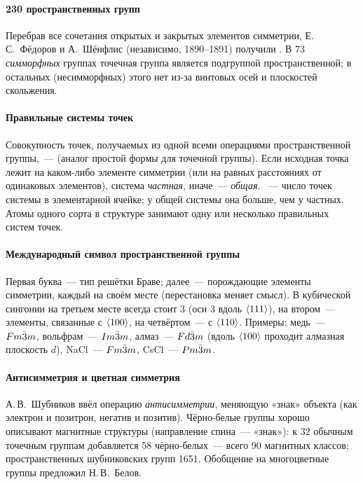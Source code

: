 \paragraph{230 пространственных групп}
Перебрав все сочетания открытых и закрытых элементов симметрии,
Е.\,С.~Фёдоров и А.~Шёнфлис (независимо, 1890--1891) получили . В 73 \emph{симморфных} группах точечная группа
является подгруппой пространственной; в остальных (несимморфных) этого
нет из-за винтовых осей и плоскостей скольжения.

\paragraph{Правильные системы точек}
Совокупность точек, получаемых из одной всеми операциями
пространственной группы,~—  (аналог
простой формы для точечной группы). Если исходная точка лежит на
каком-либо элементе симметрии (или на равных расстояниях от одинаковых
элементов), система \emph{частная}, иначе~— \emph{общая}.
~— число точек системы в элементарной ячейке; у общей
системы она больше, чем у частных. Атомы одного сорта в структуре
занимают одну или несколько правильных систем точек.

\paragraph{Международный символ пространственной группы}
Первая буква~— тип решётки Браве; далее~— порождающие элементы
симметрии, каждый на своём месте (перестановка меняет смысл). В
кубической сингонии на третьем месте всегда стоит 3 (оси 3 вдоль
$\langle 111\rangle$), на втором~— элементы, связанные с $\langle 100\rangle$, на
четвёртом~— с $\langle 110\rangle$. Примеры: медь~— $Fm\bar{3}m$, вольфрам~— $Im\bar{3}m$,
алмаз~— $Fd\bar{3}m$ (вдоль $\langle 100\rangle$ проходит алмазная плоскость $d$),
NaCl~— $Fm\bar{3}m$, CsCl~— $Pm\bar{3}m$.

\paragraph{Антисимметрия и цветная симметрия}
А.\,В.~Шубников ввёл операцию \emph{антисимметрии}, меняющую «знак»
объекта (как электрон и позитрон, негатив и позитив). Чёрно-белые группы
хорошо описывают магнитные структуры (направление спина~— «знак»): к
32 обычным точечным группам добавляется 58 чёрно-белых~— всего 90
магнитных классов; пространственных шубниковских групп 1651. Обобщение на
многоцветные группы предложил Н.\,В.~Белов.

